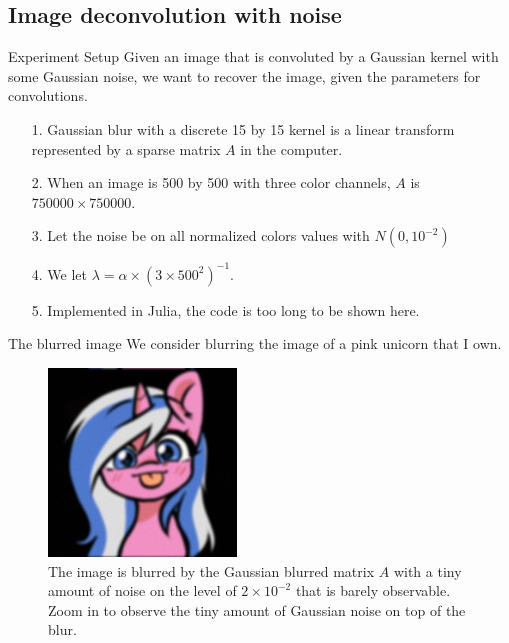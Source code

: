 \documentclass[11pt]{beamer}
\begin{document}
    \subsection{Image deconvolution with noise}
        \begin{frame}{Experiment Setup}
            Given an image that is convoluted by a Gaussian kernel with some Gaussian noise, we want to recover the image, given the parameters for convolutions. 
            \begin{itemize}
                \item [1.] Gaussian blur with a discrete 15 by 15 kernel is a linear transform represented by a sparse matrix $A$ in the computer. 
                \item [2.] When an image is 500 by 500 with three color channels, $A$ is $750000 \times 750000$. 
                \item [3.] Let the noise be on all normalized colors values with $N(0, 10^{-2})$
                \item [4.] We let $\lambda = \alpha\times (3\times500^2)^{-1}$. 
                \item [5.] Implemented in Julia, the code is too long to be shown here. 
            \end{itemize}        
        \end{frame}
        \begin{frame}{The blurred image}
            We consider blurring the image of a pink unicorn that I own. 
            \begin{figure}[H]
                \centering
                \includegraphics[width=5cm]{blurred_img.jpg}
                \caption{The image is blurred by the Gaussian blurred matrix $A$ with a tiny amount of noise on the level of $2\times 10^{-2}$ that is barely observable. Zoom in to observe the tiny amount of Gaussian noise on top of the blur.}
                \label{fig:blurred_alto}
            \end{figure}
        \end{frame}
\end{document}
